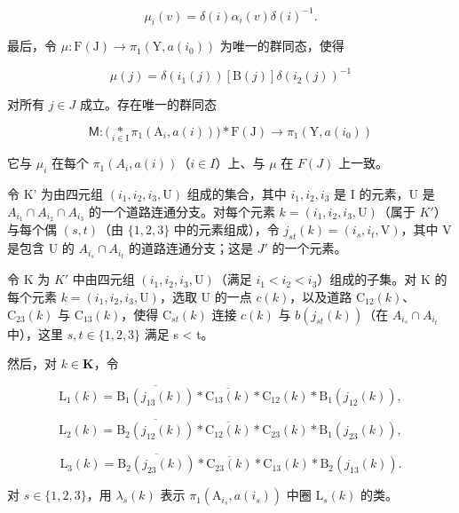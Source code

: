 \[
\mu_ {i} (v) = \delta (i) \alpha_ {i} (v) \delta (i) ^ {- 1}.
\]

最后，令 \(\mu\colon\mathrm{F}(\mathrm{J})\to\pi_{1}(\mathrm{Y},a(i_{0}))\) 为唯一的群同态，使得

\[
\mu (j) = \delta (i _ {1} (j)) [ \mathrm{B} (j) ] \delta (i _ {2} (j)) ^ {- 1}
\]

对所有 \(j \in J\) 成立。存在唯一的群同态

\[
\mathsf {M} \colon \big (\underset {i \in \mathrm{I}} {\ast} \pi_ {1} (\mathrm{A} _ {i}, a (i)) \big) \ast \mathrm{F} (\mathrm{J}) \to \pi_ {1} (\mathrm{Y}, a (i _ {0}))
\]

它与 \(\mu_i\) 在每个 \(\pi_1(A_i, a(i))\)（\(i \in I\)）上、与 \(\mu\) 在 \(F(J)\) 上一致。

令 K' 为由四元组 \((i_{1}, i_{2}, i_{3}, \mathrm{U})\) 组成的集合，其中 \(i_{1}, i_{2}, i_{3}\) 是 I 的元素，U 是 \(A_{i_{1}} \cap A_{i_{2}} \cap A_{i_{3}}\) 的一个道路连通分支。对每个元素 \(k = (i_{1}, i_{2}, i_{3}, \mathrm{U})\)（属于 \(K'\)）与每个偶 \((s, t)\)（由 \(\{1, 2, 3\}\) 中的元素组成），令 \(j_{st}(k) = (i_{s}, i_{t}, \mathrm{V})\)，其中 V 是包含 U 的 \(A_{i_{s}} \cap A_{i_{t}}\) 的道路连通分支；这是 \(J'\) 的一个元素。

令 K 为 \(K'\) 中由四元组 \((i_{1}, i_{2}, i_{3}, \mathrm{U})\)（满足 \(i_{1} < i_{2} < i_{3}\)）组成的子集。对 K 的每个元素 \(k = (i_{1}, i_{2}, i_{3}, \mathrm{U})\)，选取 U 的一点 \(c(k)\)，以及道路 \(\mathrm{C}_{12}(k)\)、\(\mathrm{C}_{23}(k)\) 与 \(\mathrm{C}_{13}(k)\)，使得 \(\mathrm{C}_{st}(k)\) 连接 \(c(k)\) 与 \(b(j_{st}(k))\)（在 \(A_{i_{s}} \cap A_{i_{t}}\) 中），这里 \(s, t \in \{1, 2, 3\}\) 满足 s \textless{} t。

然后，对 \(k \in \mathbf{K}\)，令

\[
\mathrm{L} _ {1} (k) = \overline {{\mathrm{B} _ {1} (j _ {1 3} (k))}} * \overline {{\mathrm{C} _ {1 3} (k)}} * \mathrm{C} _ {1 2} (k) * \mathrm{B} _ {1} (j _ {1 2} (k)),\tag{4}
\]

\[
\mathrm{L} _ {2} (k) = \overline {{\mathrm{B} _ {2} (j _ {1 2} (k))}} * \overline {{\mathrm{C} _ {1 2} (k)}} * \mathrm{C} _ {2 3} (k) * \mathrm{B} _ {1} (j _ {2 3} (k)),
\]

\[
\mathrm{L} _ {3} (k) = \overline {{\mathrm{B} _ {2} (j _ {2 3} (k))}} * \overline {{\mathrm{C} _ {2 3} (k)}} * \mathrm{C} _ {1 3} (k) * \mathrm{B} _ {2} (j _ {1 3} (k)).
\]

对 \(s \in \{1,2,3\}\)，用 \(\lambda_s(k)\) 表示 \(\pi_1(\mathrm{A}_{i_s}, a(i_s))\) 中圈 \(\mathrm{L}_s(k)\) 的类。

